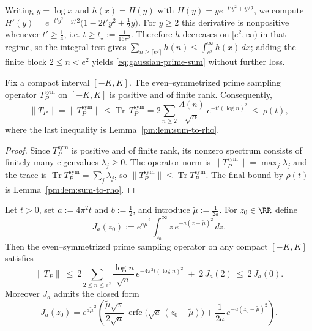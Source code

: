 \begin{remark}\label{rem:eventual-monotone}
Writing $y=\log x$ and $h(x)=H(y)$ with $H(y)=y e^{-t'y^2+y/2}$, we compute $H'(y)=e^{-t'y^2+y/2}\bigl(1-2t' y^2 + \tfrac12 y\bigr)$. For $y\ge 2$ this derivative is nonpositive whenever $t'\ge \tfrac14$, i.e. $t\ge t_\star:=\frac{1}{16\pi^2}$. Therefore $h$ decreases on $[e^2,\infty)$ in that regime, so the integral test gives $\sum_{n\ge \lceil e^2\rceil} h(n) \le \int_{e^2}^{\infty} h(x)\,dx$; adding the finite block $2\le n<e^2$ yields \eqref{eq:gaussian-prime-sum} without further loss.
\end{remark}

\begin{proposition}\label{pm:prop:norm-leq-rho}
Fix a compact interval $[-K,K]$. The even--symmetrized prime sampling operator $T_P^{\mathrm{sym}}$ on $[-K,K]$ is positive and of finite rank. Consequently,
\begin{equation}\label{eq:Prime_norm_leq_rho-formula-1}
  \|T_P\| = \|T_P^{\mathrm{sym}}\| \le \operatorname{Tr}\,T_P^{\mathrm{sym}}
  = 2\sum_{n\ge 2}\frac{\Lambda(n)}{\sqrt n}\,e^{-t'(\log n)^2}
  \ \le\ \rho(t),
\end{equation}
where the last inequality is Lemma~\ref{pm:lem:sum-to-rho}.
\end{proposition}

\begin{proof}
Since $T_P^{\mathrm{sym}}$ is positive and of finite rank, its nonzero spectrum consists of finitely many eigenvalues $\lambda_j\ge 0$. The operator norm is $\|T_P^{\mathrm{sym}}\|=\max_j \lambda_j$ and the trace is $\operatorname{Tr} T_P^{\mathrm{sym}}=\sum_j \lambda_j$, so $\|T_P^{\mathrm{sym}}\|\le \operatorname{Tr} T_P^{\mathrm{sym}}$. The final bound by $\rho(t)$ is Lemma~\ref{pm:lem:sum-to-rho}.
\end{proof}

\begin{lemma}\label{pm:lem:trace-cap-erfc}
Let $t>0$, set $a:=4\pi^2 t$ and $b:=\tfrac12$, and introduce $\widetilde{\mu}:=\frac{1}{2a}$. For $z_0\in\RR$ define
\begin{equation}\label{eq:Prime_norm_leq_rho-formula}
  J_a(z_0) := e^{a \widetilde{\mu}^{\,2}} \int_{z_0}^{\infty} z\,e^{-a (z-\widetilde{\mu})^2}\,dz.
\end{equation}
Then the even--symmetrized prime sampling operator on any compact $[-K,K]$ satisfies
\begin{equation}\label{eq:Prime_norm_leq_rho-formula-6}
  \|T_P\|\ \le\ 2\sum_{2\le n\le e^2}\frac{\log n}{\sqrt{n}}\,e^{-4\pi^2 t(\log n)^2}
  \; +\; 2\,J_a(2)\ \le\ 2\,J_a(0).
\end{equation}
Moreover $J_a$ admits the closed form
\begin{equation}\label{eq:J-closed-form}
  J_a(z_0)
  = e^{a\widetilde{\mu}^{\,2}}
    \left(
      \frac{\widetilde{\mu}\sqrt{\pi}}{2\sqrt{a}}\,
        \operatorname{erfc}\!\bigl(\sqrt{a}\,(z_0-\widetilde{\mu})\bigr)
      + \frac{1}{2a}\,e^{-a (z_0-\widetilde{\mu})^2}
    \right).
\end{equation}
\end{lemma}

